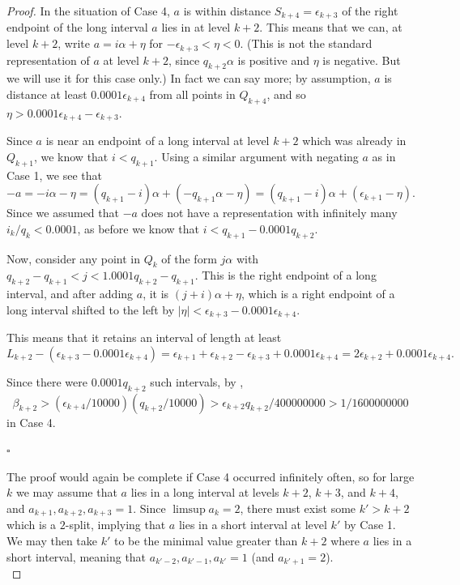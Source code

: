 \documentclass[10pt,a4paper]{amsart}
\begin{document}
\begin{proof}
In the situation of Case 4, $a$ is within distance $S_{k+4} = \epsilon_{k+3}$ of the right endpoint of the long interval $a$ lies in at level $k+2$. This means that we can, at level $k+2$, write $a = i\alpha + \eta$ for $-\epsilon_{k+3} < \eta < 0$. (This is not the standard representation of $a$ at level $k+2$, since $q_{k+2} \alpha$ is positive and $\eta$ is negative. But we will use it for this case only.) In fact we can say more; by assumption, $a$ is distance at least $0.0001\epsilon_{k+4}$ from all points in 
$Q_{k+4}$, and so $\eta > 0.0001\epsilon_{k+4} - \epsilon_{k+3}$. 

Since $a$ is near an endpoint of a long interval at level $k+2$ which was already in $Q_{k+1}$, we know that $i < q_{k+1}$. Using a similar argument with negating $a$ as in Case 1, we see that
\[
-a = -i\alpha - \eta = (q_{k+1} - i)\alpha + (-q_{k+1}\alpha - \eta) = (q_{k+1} - i)\alpha + (\epsilon_{k+1} - \eta).
\]
Since we assumed that $-a$ does not have a representation with infinitely many $i_k/q_k < 0.0001$, as before we know 
that $i < q_{k+1} - 0.0001 q_{k+2}$. 

Now, consider any point in $Q_k$ of the form $j \alpha$ with $q_{k+2} - q_{k+1} < j < 1.0001q_{k+2} - q_{k+1}$. This is the right endpoint of a long interval, and after adding $a$, it is $(j + i)\alpha + \eta$, which is a right endpoint of a long interval shifted to the left by $|\eta| < \epsilon_{k+3} - 0.0001\epsilon_{k+4}$. 

This means that it retains an interval of length at least 
\[
L_{k+2} - (\epsilon_{k+3} - 0.0001\epsilon_{k+4}) = \epsilon_{k+1} + \epsilon_{k+2} - \epsilon_{k+3} + 0.0001\epsilon_{k+4}
= 2\epsilon_{k+2} + 0.0001\epsilon_{k+4}.
\]

Since there were $0.0001q_{k+2}$ such intervals, by ,
\[
\beta_{k+2} > (\epsilon_{k+4}/10000)(q_{k+2}/10000) > \epsilon_{k+2}q_{k+2}/400000000 > 1/1600000000
\]
in Case 4.
\begin{flushright}
    $\square$\\
\end{flushright}

The proof would again be complete if Case 4 occurred infinitely often, so for large $k$ we may assume that $a$ lies in a long interval at levels $k+2$, $k+3$, and $k+4$, and $a_{k+1}, a_{k+2}, a_{k+3} = 1$. Since $\limsup a_k = 2$, there must exist some $k' > k+2$ which is a $2$-split, implying that $a$ lies in a short interval at level $k'$ by Case 1. We may then take $k'$ to be the minimal value greater than $k+2$ where $a$ lies in a short interval, meaning that $a_{k'-2}, a_{k'-1}, a_{k'} = 1$ (and $a_{k'+1} = 2$).\\


\end{proof}
\end{document}
